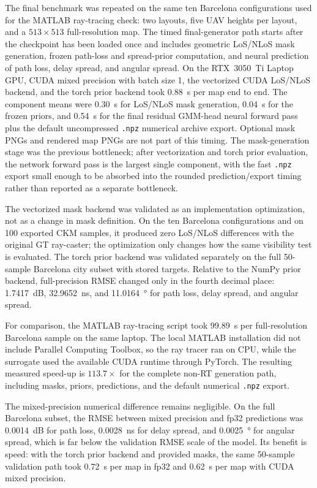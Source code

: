 The final benchmark was repeated on the same ten Barcelona configurations used
for the MATLAB ray-tracing check: two layouts, five UAV heights per layout, and
a \(513\times513\) full-resolution map. The timed final-generator path starts
after the checkpoint has been loaded once and includes geometric LoS/NLoS mask
generation, frozen path-loss and spread-prior computation, and neural
prediction of path loss, delay spread, and angular spread. On the
RTX~3050~Ti Laptop GPU, CUDA
mixed precision with batch size 1, the vectorized CUDA LoS/NLoS backend, and
the torch prior backend took \SI{0.88}{s} per map end to end. The component
means were \SI{0.30}{s} for LoS/NLoS mask generation, \SI{0.04}{s} for the
frozen priors, and \SI{0.54}{s} for the final residual GMM-head neural forward
pass plus the default uncompressed \texttt{.npz} numerical archive export.
Optional mask PNGs and rendered map PNGs are not part of this timing. The
mask-generation stage was the previous bottleneck; after vectorization and
torch prior evaluation, the network forward pass is the largest single
component, with the fast \texttt{.npz} export small enough to be absorbed into
the rounded prediction/export timing rather than reported as a separate
bottleneck.

The vectorized mask backend was validated as an implementation optimization,
not as a change in mask definition. On the ten Barcelona configurations and on
100 exported CKM samples, it produced zero LoS/NLoS differences with the
original GT ray-caster; the optimization only changes how the same visibility
test is evaluated. The torch prior backend was validated separately on the full
50-sample Barcelona city subset with stored targets. Relative to the NumPy
prior backend, full-precision RMSE changed only in the fourth decimal place:
\SI{1.7417}{dB}, \SI{32.9652}{ns}, and \SI{11.0164}{\degree} for path loss,
delay spread, and angular spread.

For comparison, the MATLAB ray-tracing script took \SI{99.89}{s} per
full-resolution Barcelona sample on the same laptop. The local MATLAB
installation did not include Parallel Computing Toolbox, so the ray tracer ran
on CPU, while the surrogate used the available CUDA runtime through PyTorch.
The resulting measured speed-up is \(113.7\times\) for the complete non-RT
generation path, including masks, priors, predictions, and the default
numerical \texttt{.npz} export.

The mixed-precision numerical difference remains negligible. On the full
Barcelona subset, the RMSE between mixed precision and fp32 predictions was
\SI{0.0014}{dB} for path loss, \SI{0.0028}{ns} for delay spread, and
\SI{0.0025}{\degree} for angular spread, which is far below the validation RMSE
scale of the model. Its benefit is speed: with the torch prior backend and
provided masks, the same 50-sample validation path took \SI{0.72}{s} per map in
fp32 and \SI{0.62}{s} per map with CUDA mixed precision.

